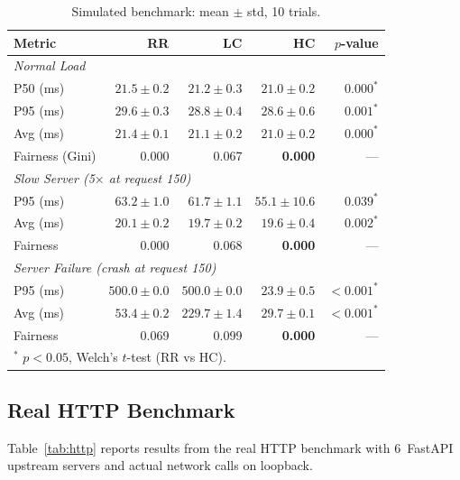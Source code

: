 \documentclass[10pt,twocolumn]{article}
\begin{document}
\begin{table}[h]
\centering
\caption{Simulated benchmark: mean $\pm$ std, 10 trials.}
\label{tab:simulated}
\small
\setlength{\tabcolsep}{4pt}
\begin{tabular}{lrrrr}
\toprule
Metric & RR & LC & HC & $p$-value \\
\midrule
\multicolumn{5}{l}{\textit{Normal Load}} \\
P50 (ms)      & $21.5{\pm}0.2$ & $21.2{\pm}0.3$ & $21.0{\pm}0.2$ & $0.000^{*}$ \\
P95 (ms)      & $29.6{\pm}0.3$ & $28.8{\pm}0.4$ & $28.6{\pm}0.6$ & $0.001^{*}$ \\
Avg (ms)      & $21.4{\pm}0.1$ & $21.1{\pm}0.2$ & $21.0{\pm}0.2$ & $0.000^{*}$ \\
Fairness (Gini) & 0.000 & 0.067 & \textbf{0.000} & --- \\
\midrule
\multicolumn{5}{l}{\textit{Slow Server (5$\times$ at request 150)}} \\
P95 (ms)      & $63.2{\pm}1.0$ & $61.7{\pm}1.1$ & $55.1{\pm}10.6$ & $0.039^{*}$ \\
Avg (ms)      & $20.1{\pm}0.2$ & $19.7{\pm}0.2$ & $19.6{\pm}0.4$  & $0.002^{*}$ \\
Fairness      & 0.000 & 0.068 & \textbf{0.000} & --- \\
\midrule
\multicolumn{5}{l}{\textit{Server Failure (crash at request 150)}} \\
P95 (ms)      & $500.0{\pm}0.0$ & $500.0{\pm}0.0$ & $\mathbf{23.9{\pm}0.5}$ & $<0.001^{*}$ \\
Avg (ms)      & $53.4{\pm}0.2$  & $229.7{\pm}1.4$ & $\mathbf{29.7{\pm}0.1}$ & $<0.001^{*}$ \\
Fairness      & 0.069 & 0.099 & \textbf{0.000} & --- \\
\bottomrule
\multicolumn{5}{l}{$^{*}$ $p{<}0.05$, Welch's $t$-test (RR vs HC).} \\
\end{tabular}
\end{table}

\subsection{Real HTTP Benchmark}

Table~\ref{tab:http} reports results from the real HTTP benchmark with
6~FastAPI upstream servers and actual network calls on loopback.
\end{document}
